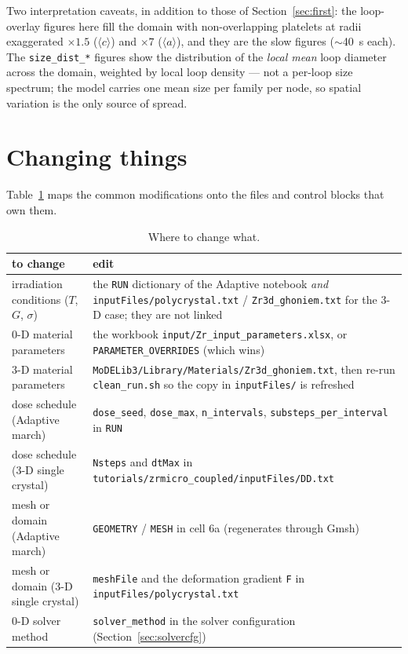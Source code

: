 \documentclass[11pt]{article}
\newcommand{\aloop}{\ensuremath{\langle a\rangle}}
\newcommand{\cloop}{\ensuremath{\langle c\rangle}}
\newcommand{\code}[1]{\texttt{\small #1}}
\newcommand{\file}[1]{\texttt{\footnotesize #1}}
\begin{document}
Two interpretation caveats, in addition to those of
Section~\ref{sec:first}: the loop-overlay figures here fill the domain with
non-overlapping platelets at radii exaggerated $\times 1.5$ (\cloop) and
$\times 7$ (\aloop), and they are the slow figures ($\sim$40~s each). The
\file{size\_dist\_*} figures show the distribution of the \emph{local mean}
loop diameter across the domain, weighted by local loop density --- not a
per-loop size spectrum; the model carries one mean size per family per node,
so spatial variation is the only source of spread.

\section{Changing things}
\label{sec:changing}

Table~\ref{tab:whereto} maps the common modifications onto the files and
control blocks that own them.

\begin{table}[htbp]
\centering
\caption{Where to change what.}
\label{tab:whereto}
\begin{tabular}{@{}p{}p{}@{}}
\toprule
to change & edit \\
\midrule
irradiation conditions ($T$, $G$, $\sigma$) &
the \code{RUN} dictionary of the Adaptive notebook \emph{and}
\file{inputFiles/polycrystal.txt} / \file{Zr3d\_ghoniem.txt} for the 3-D
case; they are not linked \\
0-D material parameters &
the workbook \file{input/Zr\_input\_parameters.xlsx}, or
\code{PARAMETER\_OVERRIDES} (which wins) \\
3-D material parameters &
\file{MoDELib3/Library/Materials/Zr3d\_ghoniem.txt}, then re-run
\file{clean\_run.sh} so the copy in \file{inputFiles/} is refreshed \\
dose schedule (Adaptive march) &
\code{dose\_seed}, \code{dose\_max}, \code{n\_intervals},
\code{substeps\_per\_interval} in \code{RUN} \\
dose schedule (3-D single crystal) &
\code{Nsteps} and \code{dtMax} in
\file{tutorials/zrmicro\_coupled/inputFiles/DD.txt} \\
mesh or domain (Adaptive march) &
\code{GEOMETRY} / \code{MESH} in cell 6a (regenerates through Gmsh) \\
mesh or domain (3-D single crystal) &
\code{meshFile} and the deformation gradient \code{F} in
\file{inputFiles/polycrystal.txt} \\
0-D solver method &
\code{solver\_method} in the solver configuration
(Section~\ref{sec:solvercfg}) \\
\bottomrule
\end{tabular}
\end{table}
\end{document}
